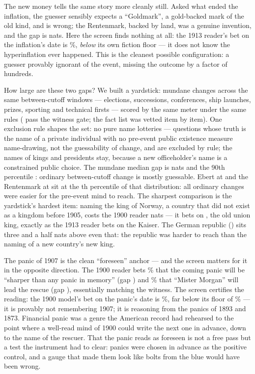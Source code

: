 \documentclass[11pt]{article}
\begin{document}
The new money tells the same story more cleanly still. Asked what ended the inflation, the guesser
sensibly expects a ``Goldmark'', a gold-backed mark of the old kind, and is wrong; the Rentenmark, backed
by land, was a genuine invention, and the gap is \NinflendGap{} nats. Here the screen finds nothing at
all: the 1913 reader's bet on the inflation's date is \NdateInfl\%, \emph{below} its own fiction floor ---
it does not know the hyperinflation ever happened. This is the cleanest possible configuration: a guesser
provably ignorant of the event, missing the outcome by a factor of hundreds.

How large are these two gaps? We built a yardstick: \NmundaneN{} mundane changes across the same
between-cutoff windows --- elections, successions, conferences, ship launches, prizes, sporting and
technical firsts --- scored by the same meter under the same rules (\NmundaneGated{} pass the witness
gate; the fact list was vetted item by item). One
exclusion rule shapes the set: no pure name lotteries --- questions whose truth is the name of a private
individual with no pre-event public existence measure name-drawing, not the guessability of change, and
are excluded by rule; the names of kings and presidents stay, because a new officeholder's name is a
constrained public choice. The mundane median gap is \NmundaneMedian{} nats and the 90th percentile
\NmundaneNinety{}: ordinary between-cutoff change is mostly guessable. Ebert at \NkaiserGap{} and the
Rentenmark at \NinflendGap{} sit at the \NkaiserMundanePct th percentile of that distribution: all
\NmundaneGated{} ordinary changes were easier for the pre-event mind to reach. The sharpest comparison
is the yardstick's hardest item: naming the king of Norway, a country that did not exist as a kingdom
before 1905, costs the 1900 reader \NnorwayGap{} nats --- it bets on \NnorwayGuesserBet{}, the old union
king, exactly as the 1913 reader bets on the Kaiser. The German republic (\NkaiserGap{}) sits three and
a half nats above even that: the republic was harder to reach than the naming of a new country's new
king.

The panic of 1907 is the clean ``foreseen'' anchor --- and the screen matters for it in the opposite
direction. The 1900 reader bets \NpanicsevPre\% that the coming panic will be ``sharper than any panic in
memory'' (gap \NpanicsevGap) and \NpanicrescPre\% that ``Mister Morgan'' will lead the rescue (gap
\NpanicrescGap), essentially matching the witness. The screen certifies the reading: the 1900 model's bet
on the panic's date is \NdatePanic\%, far below its floor of \NfloorNineHundred\% --- it is provably not
remembering 1907; it is reasoning from the panics of 1893 and 1873. Financial panic was a genre the
American record had rehearsed to the point where a well-read mind of 1900 could write the next one in
advance, down to the name of the rescuer. That the panic reads as foreseen is not a free pass but a test
the instrument had to clear: panics were chosen in advance as the positive control, and a gauge that made
them look like bolts from the blue would have been wrong.
\end{document}
